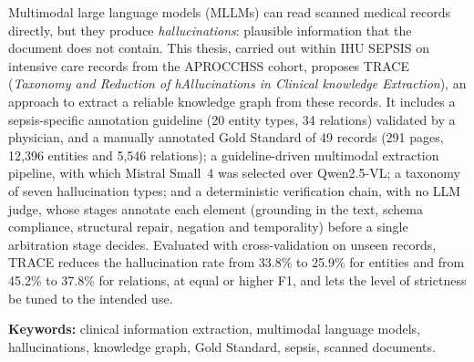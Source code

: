 Multimodal large language models (MLLMs) can read scanned medical records directly, but they produce \emph{hallucinations}: plausible information that the document does not contain. This thesis, carried out within IHU SEPSIS on intensive care records from the APROCCHSS cohort, proposes TRACE (\textit{Taxonomy and Reduction of hAllucinations in Clinical knowledge Extraction}), an approach to extract a reliable knowledge graph from these records. It includes a sepsis-specific annotation guideline (20 entity types, 34 relations) validated by a physician, and a manually annotated Gold Standard of 49 records (291 pages, 12,396 entities and 5,546 relations); a guideline-driven multimodal extraction pipeline, with which Mistral Small~4 was selected over Qwen2.5-VL; a taxonomy of seven hallucination types; and a deterministic verification chain, with no LLM judge, whose stages annotate each element (grounding in the text, schema compliance, structural repair, negation and temporality) before a single arbitration stage decides. Evaluated with cross-validation on unseen records, TRACE reduces the hallucination rate from 33.8\% to 25.9\% for entities and from 45.2\% to 37.8\% for relations, at equal or higher F1, and lets the level of strictness be tuned to the intended use.

\medskip
\noindent\textbf{Keywords:} clinical information extraction, multimodal language models, hallucinations, knowledge graph, Gold Standard, sepsis, scanned documents.
